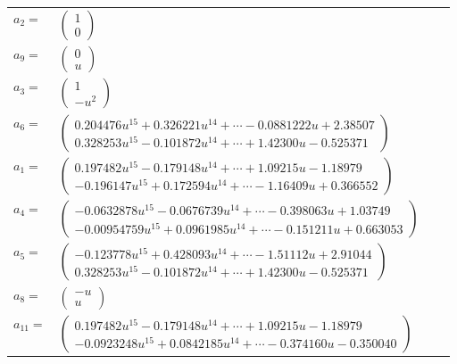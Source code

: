 \documentclass[1p]{elsarticle_modified}
\theoremstyle{definition}
\begin{document}
\begin{tabular}{m{7pt} m{180pt} m{7pt} m{180pt} }
\flushright $a_{2}=$&$\begin{pmatrix}1\\0\end{pmatrix}$ \\
\flushright $a_{9}=$&$\begin{pmatrix}0\\u\end{pmatrix}$ \\
\flushright $a_{3}=$&$\begin{pmatrix}1\\- u^2\end{pmatrix}$ \\
\flushright $a_{6}=$&$\begin{pmatrix}0.204476 u^{15}+0.326221 u^{14}+\cdots-0.0881222 u+2.38507\\0.328253 u^{15}-0.101872 u^{14}+\cdots+1.42300 u-0.525371\end{pmatrix}$ \\
\flushright $a_{1}=$&$\begin{pmatrix}0.197482 u^{15}-0.179148 u^{14}+\cdots+1.09215 u-1.18979\\-0.196147 u^{15}+0.172594 u^{14}+\cdots-1.16409 u+0.366552\end{pmatrix}$ \\
\flushright $a_{4}=$&$\begin{pmatrix}-0.0632878 u^{15}-0.0676739 u^{14}+\cdots-0.398063 u+1.03749\\-0.00954759 u^{15}+0.0961985 u^{14}+\cdots-0.151211 u+0.663053\end{pmatrix}$ \\
\flushright $a_{5}=$&$\begin{pmatrix}-0.123778 u^{15}+0.428093 u^{14}+\cdots-1.51112 u+2.91044\\0.328253 u^{15}-0.101872 u^{14}+\cdots+1.42300 u-0.525371\end{pmatrix}$ \\
\flushright $a_{8}=$&$\begin{pmatrix}- u\\u\end{pmatrix}$ \\
\flushright $a_{11}=$&$\begin{pmatrix}0.197482 u^{15}-0.179148 u^{14}+\cdots+1.09215 u-1.18979\\-0.0923248 u^{15}+0.0842185 u^{14}+\cdots-0.374160 u-0.350040\end{pmatrix}$ \\

\end{tabular}
\end{document}
